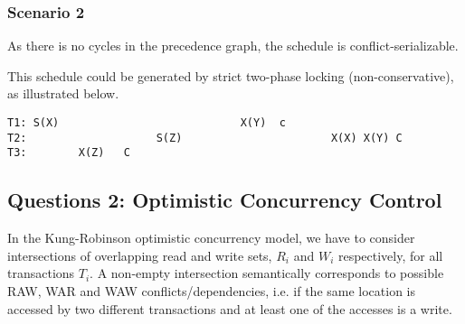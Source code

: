 \documentclass[11pt,a4paper,english]{article}
\begin{document}
\subsubsection{Scenario 2}


\begin{figure}[H]
\centering
{}
\end{figure}


As there is no cycles in the precedence graph, the schedule is conflict-serializable.

This schedule could be generated by strict two-phase locking (non-conservative),
as illustrated below.

\begin{verbatim}
T1: S(X)                            X(Y)  c
T2:                    S(Z)                       X(X) X(Y) C
T3:        X(Z)   C
\end{verbatim}

\subsection{Questions 2: Optimistic Concurrency Control}
In the Kung-Robinson optimistic concurrency model, we have to consider intersections of overlapping read and write sets, $R_{i}$ and $W_{i}$ respectively, for all transactions $T_{i}$. A non-empty intersection semantically corresponds to possible RAW, WAR and WAW conflicts/dependencies, i.e. if the same location is accessed by two different transactions and at least one of the accesses is a write. 
\end{document}
